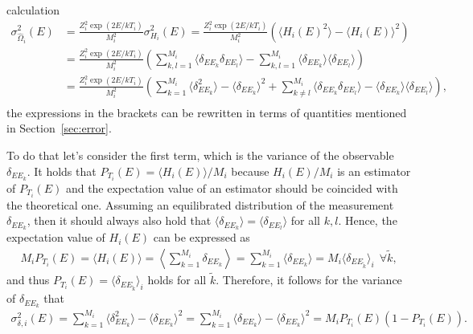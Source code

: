 calculation
\begin{align*}
    \sigma^2_{\hat{\Omega}_i}(E) &\!=\! \frac{Z_i^2\exp(2E/kT_i)}{M^2_i}\sigma^2_{H_i}(E)
                                  \!=\! \frac{Z_i^2\exp(2E/kT_i)}{M^2_i}\left(\langle H_i(E)^2\rangle-\langle H_i(E)\rangle^2\right) \\
                                 &\!=\! \frac{Z_i^2\exp(2E/kT_i)}{M^2_i}
                                        \!\left(\sum_{k,l=1}^{M_i}\langle\delta_{EE_k}\delta_{EE_l}\rangle-
                                                \sum_{k,l=1}^{M_i}\langle\delta_{EE_k}\rangle\langle\delta_{EE_l}\rangle\right)\\
                                 &\!=\! \frac{Z_i^2\exp(2E/kT_i)}{M^2_i}
                                        \!\left(\!\sum_{k=1}^{M_i}\!\langle\delta_{EE_k}^2\rangle\!-\!\langle\delta_{EE_k}\rangle^2+\!
                                                \sum_{k\neq l}^{M_i}\!\langle\delta_{EE_k}\delta_{EE_l}\rangle\!-\!\langle\delta_{EE_k}\rangle\langle\delta_{EE_l}\rangle\!\!\right)\!,\\
\end{align*}
the expressions in the brackets can be rewritten in terms of quantities mentioned in Section~\ref{sec:error}.~\cite{Janke2012}

To do that let's consider the first term, which is the variance of the observable $\delta_{EE_k}$.
It holds that $P_{T_i}(E)=\langle H_i(E)\rangle/M_i$ because $H_i(E)/M_i$ is an estimator of $P_{T_i}(E)$ and the expectation value of an estimator
should be coincided with the theoretical one.
Assuming an equilibrated distribution of the measurement $\delta_{EE_k}$, then it should 
always also hold that $\langle\delta_{EE_k}\rangle=\langle\delta_{EE_l}\rangle$ for all $k,l$. Hence, the expectation value of $H_i(E)$ can be expressed as
\begin{align*}
    M_iP_{T_i}(E)=\langle H_i(E)\rangle=\left\langle\sum_{k=1}^{M_i}\delta_{EE_k}\right\rangle
             =\sum_{k=1}^{M_i}\langle\delta_{EE_k}\rangle=M_i\langle\delta_{EE_{\tilde{k}}}\rangle_i \  \  \forall \tilde{k}, 
\end{align*}
and thus $P_{T_i}(E)\!=\!\langle\delta_{EE_{\tilde{k}}}\rangle_i$ holds for all $\tilde{k}$. Therefore, it follows for the variance of $\delta_{EE_k}$ that
\begin{align*}
    \sigma^2_{\delta,i}(E)=\sum_{k=1}^{M_i}\langle\delta_{EE_k}^2\rangle\!-\!\langle\delta_{EE_k}\rangle^2=\sum_{k=1}^{M_i}\langle\delta_{EE_k}\rangle\!-\!\langle\delta_{EE_k}\rangle^2
                            =M_iP_{T_i}(E)(1\!-\!P_{T_i}(E)). 
\end{align*}

